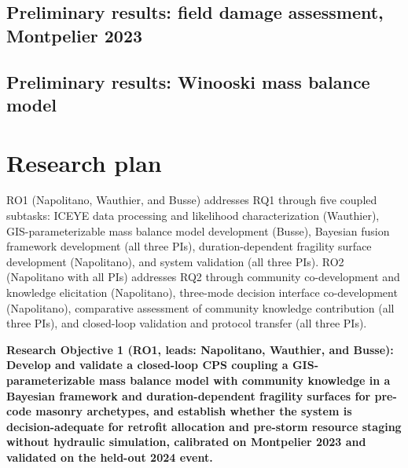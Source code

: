 \documentclass[11pt]{article}
\begin{document}
\subsection{Preliminary results: field damage assessment, Montpelier 2023}

\subsection{Preliminary results: Winooski mass balance model}


\section{Research plan}
RO1 (Napolitano, Wauthier, and Busse) addresses RQ1 through five coupled subtasks:
ICEYE data processing and likelihood characterization (Wauthier), GIS-parameterizable
mass balance model development (Busse), Bayesian fusion framework development (all
three PIs), duration-dependent fragility surface development (Napolitano), and
system validation (all three PIs).
RO2 (Napolitano with all PIs) addresses RQ2 through community co-development and
knowledge elicitation (Napolitano), three-mode decision interface co-development
(Napolitano), comparative assessment of community knowledge contribution (all three
PIs), and closed-loop validation and protocol transfer (all three PIs).

\begin{tcolorbox}[colback=mycmykcolor,colframe=black,boxrule=1pt,coltext=black,
  left=1mm,right=1mm,top=1mm,bottom=1mm]
\textbf{Research Objective 1 (RO1, leads: Napolitano, Wauthier, and Busse):
Develop and validate a closed-loop CPS coupling a GIS-parameterizable mass balance
model with community knowledge in a Bayesian framework and duration-dependent
fragility surfaces for pre-code masonry archetypes, and establish whether the system
is decision-adequate for retrofit allocation and pre-storm resource staging without
hydraulic simulation, calibrated on Montpelier 2023 and validated on the held-out
2024 event.}
\end{tcolorbox}
\end{document}
